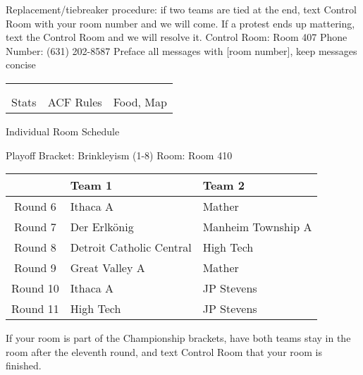 \documentclass{article}%
\begin{document}
\newline%
Replacement/tiebreaker procedure: if two teams are tied at the end, text Control Room with your room number and we will come. If a protest ends up mattering, text the Control Room and we will resolve it.\newline%
\newline%
Control Room: Room 407\newline%
Phone Number: (631) 202{-}8587\newline%
Preface all messages with {[}room number{]}, keep messages concise%
\vspace*{30pt}%
\newline%
%
\begin{tabularx}{\textwidth}{YYY}%
  &  &  \\%
\\%
Stats&ACF Rules&Food, Map\\%
\end{tabularx}%
\newpage%
\begin{center}%
\begin{Huge}%
Individual Room Schedule%
\end{Huge}%
\vspace*{16pt}%
\linebreak%
\begin{Large}%
Playoff Bracket: Brinkleyism (1-8) \hfill Room: Room 410%
\end{Large}%
\end{center}%
%
\begin{tabularx}{\textwidth}{|c|Y|Y|}%
\hline%
&Team 1&Team 2\\%
\hline%
Round 6&Ithaca A&Mather\\%
Round 7&Der Erlkönig&Manheim Township A\\%
Round 8&Detroit Catholic Central&High Tech\\%
Round 9&Great Valley A&Mather\\%
Round 10&Ithaca A&JP Stevens\\%
Round 11&High Tech&JP Stevens\\%
\hline%
\end{tabularx}%
\vspace*{16pt}%
\linebreak%
If your room is part of the Championship brackets, have both teams stay in the room after the eleventh round, and text Control Room that your room is finished.\newline%
\end{document}
